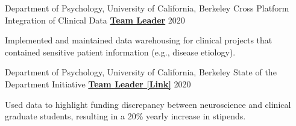 \begin{cventries}
    
  \cventry 
    {Department of Psychology, University of California, Berkeley} %
    {Cross Platform Integration of Clinical Data}
    {\href{http://www.actcompthink.org/pubs/McDougleTsayEtAl_2021.pdf}{\textbf{Team Leader}}} %
    {2020} %
    {
      \begin{cvitems} %
      	\item {Implemented and maintained data warehousing for clinical projects that contained sensitive patient information (e.g., disease etiology).}
      \end{cvitems}
    } 

  \cventry 
    {Department of Psychology, University of California, Berkeley} %
    {State of the Department Initiative}
    {\href{https://drive.google.com/file/d/1wD7y5gW39EU4vQUyhcrO7Fra1Ttc_HyG/view?usp=sharing}{\textbf{Team Leader [Link]}}} %
    {2020} %
    {
      \begin{cvitems} %
      	\item {Used data to highlight funding discrepancy between neuroscience and clinical graduate students, resulting in a 20\% yearly increase in stipends.}
      \end{cvitems}
    }
    
\end{cventries}

